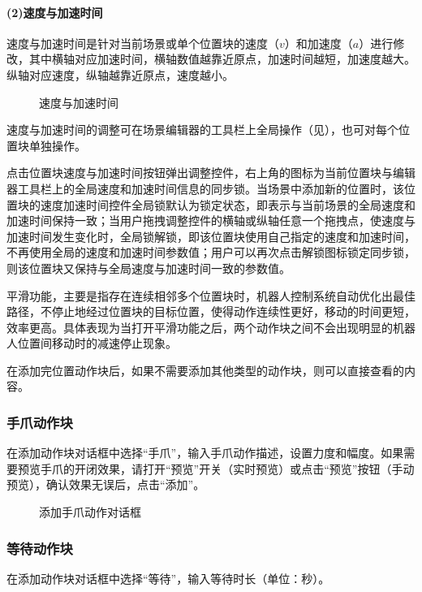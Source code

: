 \paragraph{(2)\quad 速度与加速时间}
速度与加速时间是针对当前场景或单个位置块的速度（$v$）和加速度（$a$）进行修改，其中横轴对应加速时间，横轴数值越靠近原点，加速时间越短，加速度越大。纵轴对应速度，纵轴越靠近原点，速度越小。

\begin{figure}[ht]
	\centering
	\color{red}{缺图}
	\caption{速度与加速时间}
	\label{fig:速度与加速时间}
\end{figure}

速度与加速时间的调整可在场景编辑器的工具栏上全局操作（见），也可对每个位置块单独操作。

点击位置块速度与加速时间按钮弹出调整控件，右上角的图标为当前位置块与编辑器工具栏上的全局速度和加速时间信息的同步锁。当场景中添加新的位置时，该位置块的速度加速时间控件全局锁默认为锁定状态，即表示与当前场景的全局速度和加速时间保持一致；当用户拖拽调整控件的横轴或纵轴任意一个拖拽点，使速度与加速时间发生变化时，全局锁解锁，即该位置块使用自己指定的速度和加速时间，不再使用全局的速度和加速时间参数值；用户可以再次点击解锁图标锁定同步锁，则该位置块又保持与全局速度与加速时间一致的参数值。

平滑功能，主要是指存在连续相邻多个位置块时，机器人控制系统自动优化出最佳路径，不停止地经过位置块的目标位置，使得动作连续性更好，移动的时间更短，效率更高。具体表现为当打开平滑功能之后，两个动作块之间不会出现明显的机器人位置间移动时的减速停止现象。

在添加完位置动作块后，如果不需要添加其他类型的动作块，则可以直接查看的内容。

\subsubsection{手爪动作块}
在添加动作块对话框中选择“手爪”，输入手爪动作描述，设置力度和幅度。如果需要预览手爪的开闭效果，请打开“预览”开关（实时预览）或点击“预览”按钮（手动预览），确认效果无误后，点击“添加”。

\begin{figure}[ht]
	\centering
	\color{red}{缺图}
	\caption{添加手爪动作对话框}
	\label{fig:添加手爪动作对话框}
\end{figure}

\subsubsection{等待动作块}
在添加动作块对话框中选择“等待”，输入等待时长（单位：秒）。
